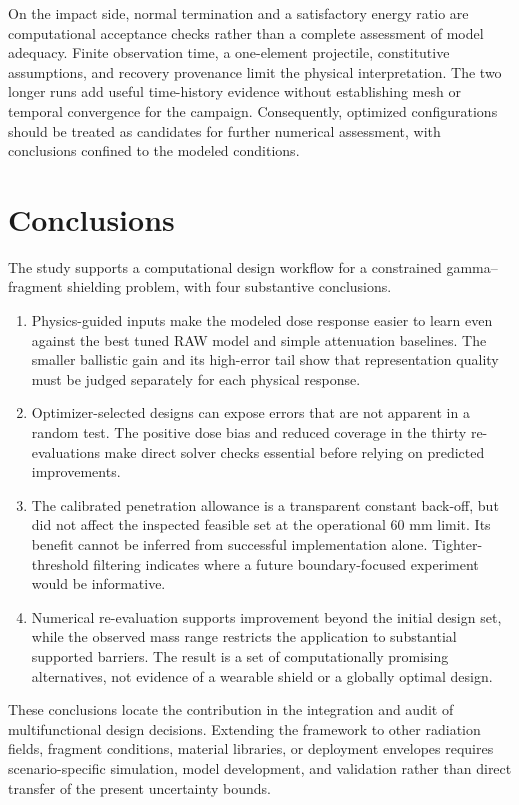 \documentclass[12pt]{elsarticle}
\begin{document}
On the impact side, normal termination and a satisfactory energy ratio are computational acceptance checks rather than a complete assessment of model adequacy. Finite observation time, a one-element projectile, constitutive assumptions, and recovery provenance limit the physical interpretation. The two longer runs add useful time-history evidence without establishing mesh or temporal convergence for the campaign. Consequently, optimized configurations should be treated as candidates for further numerical assessment, with conclusions confined to the modeled conditions.

\section{Conclusions}
The study supports a computational design workflow for a constrained gamma--fragment shielding problem, with four substantive conclusions.
\begin{enumerate}
\item Physics-guided inputs make the modeled dose response easier to learn even against the best tuned RAW model and simple attenuation baselines. The smaller ballistic gain and its high-error tail show that representation quality must be judged separately for each physical response.
\item Optimizer-selected designs can expose errors that are not apparent in a random test. The positive dose bias and reduced coverage in the thirty re-evaluations make direct solver checks essential before relying on predicted improvements.
\item The calibrated penetration allowance is a transparent constant back-off, but did not affect the inspected feasible set at the operational 60 mm limit. Its benefit cannot be inferred from successful implementation alone. Tighter-threshold filtering indicates where a future boundary-focused experiment would be informative.
\item Numerical re-evaluation supports improvement beyond the initial design set, while the observed mass range restricts the application to substantial supported barriers. The result is a set of computationally promising alternatives, not evidence of a wearable shield or a globally optimal design.
\end{enumerate}
These conclusions locate the contribution in the integration and audit of multifunctional design decisions. Extending the framework to other radiation fields, fragment conditions, material libraries, or deployment envelopes requires scenario-specific simulation, model development, and validation rather than direct transfer of the present uncertainty bounds.
\end{document}
